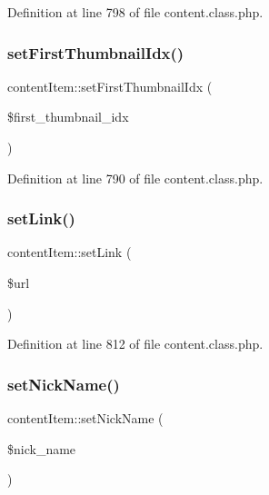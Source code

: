 Definition at line 798 of file content.\+class.\+php.

\mbox{\label{classcontentItem_ab18307a6068a6cdde94369976fe730f4}} 
\subsubsection{\texorpdfstring{set\+First\+Thumbnail\+Idx()}{setFirstThumbnailIdx()}}
{\footnotesize\ttfamily content\+Item\+::set\+First\+Thumbnail\+Idx (\begin{DoxyParamCaption}\item[{}]{\$first\+\_\+thumbnail\+\_\+idx }\end{DoxyParamCaption})}



Definition at line 790 of file content.\+class.\+php.

\mbox{\label{classcontentItem_aad5f15eead8728ad5e2636740c4ff145}} 
\subsubsection{\texorpdfstring{set\+Link()}{setLink()}}
{\footnotesize\ttfamily content\+Item\+::set\+Link (\begin{DoxyParamCaption}\item[{}]{\$url }\end{DoxyParamCaption})}



Definition at line 812 of file content.\+class.\+php.

\mbox{\label{classcontentItem_ae3175aa0291e75bf95cb1220e50a33e4}} 
\subsubsection{\texorpdfstring{set\+Nick\+Name()}{setNickName()}}
{\footnotesize\ttfamily content\+Item\+::set\+Nick\+Name (\begin{DoxyParamCaption}\item[{}]{\$nick\+\_\+name }\end{DoxyParamCaption})}



